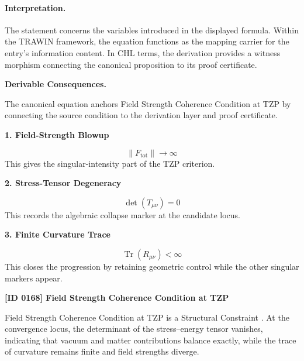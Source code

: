 \paragraph{Interpretation.}
The statement concerns the variables introduced in the displayed formula. Within the TRAWIN framework, the equation functions as the mapping carrier for the entry’s information content. In CHL terms, the derivation provides a witness morphism connecting the canonical proposition to its proof certificate.

\par\vspace{0.35em}
\noindent\textbf{Derivable Consequences.}\quad
\begingroup
\footnotesize
\raggedright
The canonical equation anchors Field Strength Coherence Condition at TZP by connecting the source condition to the derivation layer and proof certificate.
\par\endgroup

\noindent\textbf{1. Field-Strength Blowup}\par
\[
\|F_{\mathrm{tot}}\|\to \infty
\]
\noindent This gives the singular-intensity part of the TZP criterion.\par
\noindent\textbf{2. Stress-Tensor Degeneracy}\par
\[
\det(T_{\mu\nu})=0
\]
\noindent This records the algebraic collapse marker at the candidate locus.\par
\noindent\textbf{3. Finite Curvature Trace}\par
\[
\operatorname{Tr}(R_{\mu\nu})<\infty
\]
\noindent This closes the progression by retaining geometric control while the other singular markers appear.\par

\clearpage
\noindent\textbf{[ID 0168] Field Strength Coherence Condition at TZP}\par
\vspace{0.35em}
\begingroup\small
{}
Field Strength Coherence Condition at TZP is a Structural Constraint  . At the convergence locus, the determinant of the stress--energy tensor vanishes, indicating that vacuum and matter contributions balance exactly, while the trace of curvature remains finite and field strengths diverge.  

